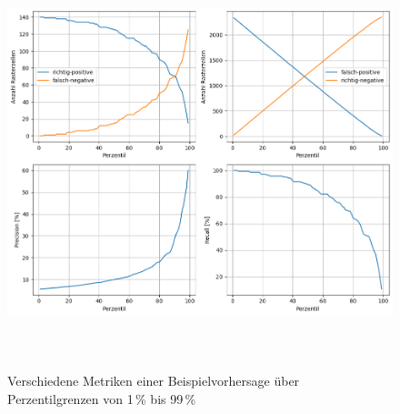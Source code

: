 \begin{figure}[h]
    \centering
    \includegraphics[width=1.0\textwidth,height=12cm,keepaspectratio=true]{content/images/PredExGraphs.png}
    \caption{Verschiedene Metriken einer Beispielvorhersage über Perzentilgrenzen von 1\,\% bis 99\,\%}
    \label{fig:PredExGraphs}
\end{figure}

